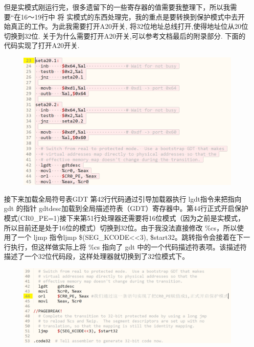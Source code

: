 \documentclass[a4paper,12pt]{report}
\begin{document}
但是实模式刚运行完，很多遗留下的一些寄存器的值需要我整理下，所以我需要“在16～19行中 将 %
实模式的东西处理完，我的重点是要转换到保护模式中去开始真正的工作。为此我需要打开A20开关, 将32位地址总线打开,使得地址位从20位切换到32位.
关于为什么需要打开A20开关,可以参考文档最后的附录部分.
下面的代码实现了打开A20开关.
\begin{figure}[H]
	\centering
	\includegraphics [width=1.0\textwidth]{figure//image90.png}
\end{figure}
接下来加载全局符号表GDT
第42行代码通过引导加载器执行 lgdt指令来把指向 gdt 的指针 gdtdesc加载到全局描述符表（GDT）寄存器中。第44行正式开启保护模式(CR0\_PE=1)接下来第51行处理器还需要将16位模式（因为之前是实模式，所以目前还是处于16位的模式）切换到32位。由于我没法直接修改 \%cs，所以使用了一个 ljmp 指令ljmp \$(SEG\_KCODE<<3), \$start32。跳转指令会接着在下一行执行，但这样做实际上将 \%cs 指向了 gdt 中的一个代码描述符表项。该描述符描述了一个32位代码段，这样处理器就切换到了32位模式下。
\begin{figure}[H]
	\centering
	\includegraphics [width=1.0\textwidth]{figure//image91.png}
\end{figure}
\end{document}
